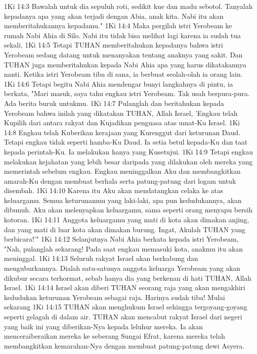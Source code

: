 1Ki 14:3  Bawalah untuk dia sepuluh roti, sedikit kue dan madu sebotol. Tanyalah kepadanya apa yang akan terjadi dengan Abia, anak kita. Nabi itu akan memberitahukannya kepadamu."
1Ki 14:4  Maka pergilah istri Yerobeam ke rumah Nabi Ahia di Silo. Nabi itu tidak bisa melihat lagi karena ia sudah tua sekali.
1Ki 14:5  Tetapi TUHAN memberitahukan kepadanya bahwa istri Yerobeam sedang datang untuk menanyakan tentang anaknya yang sakit. Dan TUHAN juga memberitahukan kepada Nabi Ahia apa yang harus dikatakannya nanti. Ketika istri Yerobeam tiba di sana, ia berbuat seolah-olah ia orang lain.
1Ki 14:6  Tetapi begitu Nabi Ahia mendengar bunyi langkahnya di pintu, ia berkata, "Mari masuk, saya tahu engkau istri Yerobeam. Tak usah berpura-pura. Ada berita buruk untukmu.
1Ki 14:7  Pulanglah dan beritahukan kepada Yerobeam bahwa inilah yang dikatakan TUHAN, Allah Israel, 'Engkau telah Kupilih dari antara rakyat dan Kujadikan penguasa atas umat-Ku Israel.
1Ki 14:8  Engkau telah Kuberikan kerajaan yang Kurenggut dari keturunan Daud. Tetapi engkau tidak seperti hamba-Ku Daud. Ia setia betul kepada-Ku dan taat kepada perintah-Ku. Ia melakukan hanya yang Kusetujui.
1Ki 14:9  Tetapi engkau melakukan kejahatan yang lebih besar daripada yang dilakukan oleh mereka yang memerintah sebelum engkau. Engkau meninggalkan Aku dan membangkitkan amarah-Ku dengan membuat berhala serta patung-patung dari logam untuk disembah.
1Ki 14:10  Karena itu Aku akan mendatangkan celaka ke atas keluargamu. Semua keturunanmu yang laki-laki, apa pun kedudukannya, akan dibunuh. Aku akan melenyapkan keluargamu, sama seperti orang menyapu bersih kotoran.
1Ki 14:11  Anggota keluargamu yang mati di kota akan dimakan anjing, dan yang mati di luar kota akan dimakan burung. Ingat, Akulah TUHAN yang berbicara!'"
1Ki 14:12  Selanjutnya Nabi Ahia berkata kepada istri Yerobeam, "Nah, pulanglah sekarang! Pada saat engkau memasuki kota, anakmu itu akan meninggal.
1Ki 14:13  Seluruh rakyat Israel akan berkabung dan menguburkannya. Dialah satu-satunya anggota keluarga Yerobeam yang akan dikubur secara terhormat, sebab hanya dia yang berkenan di hati TUHAN, Allah Israel.
1Ki 14:14  Israel akan diberi TUHAN seorang raja yang akan mengakhiri kedudukan keturunan Yerobeam sebagai raja. Harinya sudah tiba! Mulai sekarang
1Ki 14:15  TUHAN akan menghukum Israel sehingga tergoyang-goyang seperti gelagah di dalam air. TUHAN akan mencabut rakyat Israel dari negeri yang baik ini yang diberikan-Nya kepada leluhur mereka. Ia akan menceraiberaikan mereka ke seberang Sungai Efrat, karena mereka telah membangkitkan kemarahan-Nya dengan membuat patung-patung dewi Asyera.
